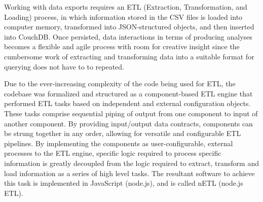 Working with data exports requires an ETL (Extraction, Transformation, and Loading) process, in which information stored in the CSV files is loaded into computer memory, transformed into JSON-structured objects, and then inserted into CouchDB. Once persisted, data interactions in terms of producing analyses becomes a flexible and agile process with room for creative insight since the cumbersome work of extracting and transforming data into a suitable format for querying does not have to to repeated.

Due to the ever-increasing complexity of the code being used for ETL, the codebase was formalized and structured as a component-based ETL engine that performed ETL tasks based on independent and external configuration objects. These tasks comprise sequential piping of output from one component to input of another component. By providing input/output data contracts, components can be strung together in any order, allowing for versatile and configurable ETL pipelines. By implementing the components as user-configurable, external processes to the ETL engine, specific logic required to process specific information is greatly decoupled from the logic required to extract, transform and load information as a series of high level tasks. The resultant software to achieve this task is implemented in JavaScript (node.js), and is called nETL (node.js ETL).
